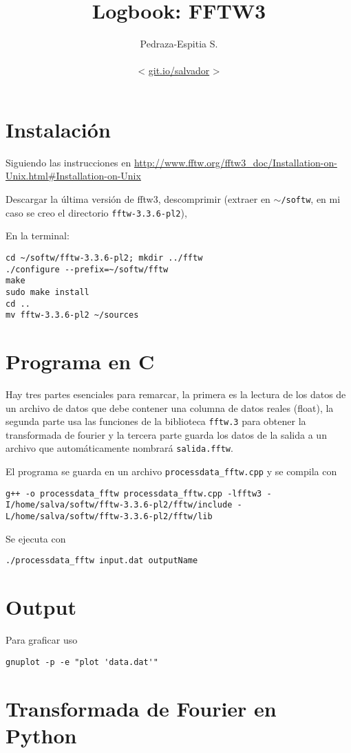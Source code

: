\documentclass[letterpaper,11pt]{article}
\title{Logbook:  FFTW3}
\author{Pedraza-Espitia S.\\ \\< \url{git.io/salvador} >}
\date{}
\begin{document}
\maketitle
{}

%
%
\section{Instalación}
Siguiendo las instrucciones en \url{http://www.fftw.org/fftw3_doc/Installation-on-Unix.html#Installation-on-Unix}

Descargar la última versión de fftw3, descomprimir (extraer en $\sim$\verb|/softw|, en mi caso se creo el directorio \verb|fftw-3.3.6-pl2|), 

En la terminal:
\begin{lstlisting}
cd ~/softw/fftw-3.3.6-pl2; mkdir ../fftw
./configure --prefix=~/softw/fftw
make
sudo make install
cd ..
mv fftw-3.3.6-pl2 ~/sources
\end{lstlisting}

\section{Programa en C}
Hay tres partes esenciales para remarcar, la primera es la lectura de los datos de un archivo de datos que debe contener una columna de datos reales (float), la segunda parte usa las funciones de la biblioteca \verb|fftw.3| para obtener la transformada de fourier y la tercera parte guarda los datos de la salida a un archivo que automáticamente nombrará \verb|salida.fftw|.


El programa se guarda en un archivo \verb|processdata_fftw.cpp| y se compila con\\
\begin{lstlisting}
g++ -o processdata_fftw processdata_fftw.cpp -lfftw3 -I/home/salva/softw/fftw-3.3.6-pl2/fftw/include -L/home/salva/softw/fftw-3.3.6-pl2/fftw/lib
\end{lstlisting}

Se ejecuta con
\begin{lstlisting}
./processdata_fftw input.dat outputName
\end{lstlisting}
\section{Output}
\label{sec:output}
Para graficar uso
\begin{lstlisting}
gnuplot -p -e "plot 'data.dat'"
\end{lstlisting}
\FloatBarrier
\section{Transformada de Fourier en Python}
\label{sec:TFP}




\end{document}
